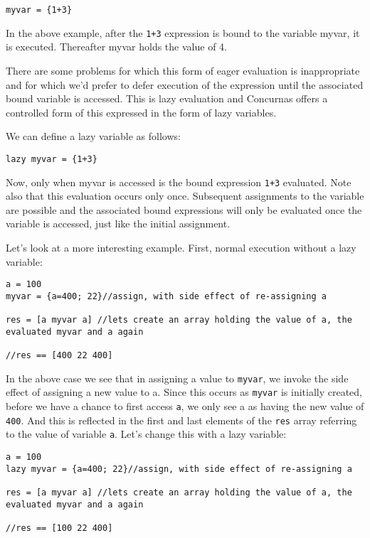 \documentclass[conc-doc]{subfiles}
\begin{document}
\begin{lstlisting}
myvar = {1+3}
\end{lstlisting}

In the above example, after the \lstinline{1+3} expression is bound to the variable myvar, it is executed. Thereafter myvar holds the value of 4.

There are some problems for which this form of eager evaluation is inappropriate and for which we'd prefer to defer execution of the expression until the associated bound variable is accessed. This is lazy evaluation and Concurnas offers a controlled form of this expressed in the form of lazy variables.

We can define a lazy variable as follows:
\begin{lstlisting}
lazy myvar = {1+3}
\end{lstlisting}

Now, only when myvar is accessed is the bound expression \lstinline{1+3} evaluated. Note also that this evaluation occurs only once. Subsequent assignments to the variable are possible and the associated bound expressions will only be evaluated once the variable is accessed, just like the initial assignment.

Let's look at a more interesting example. First, normal execution without a lazy variable:

\begin{lstlisting}
a = 100
myvar = {a=400; 22}//assign, with side effect of re-assigning a

res = [a myvar a] //lets create an array holding the value of a, the evaluated myvar and a again

//res == [400 22 400]
\end{lstlisting}

In the above case we see that in assigning a value to \lstinline{myvar}, we invoke the side effect of assigning a new value to a. Since this occurs as \lstinline{myvar} is initially created, before we have a chance to first access \lstinline{a}, we only see a as having the new value of \lstinline{400}. And this is reflected in the first and last elements of the \lstinline{res} array referring to the value of variable \lstinline{a}. Let's change this with a lazy variable:

\begin{lstlisting}
a = 100
lazy myvar = {a=400; 22}//assign, with side effect of re-assigning a

res = [a myvar a] //lets create an array holding the value of a, the evaluated myvar and a again

//res == [100 22 400]
\end{lstlisting}
\end{document}
